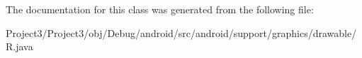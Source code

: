 The documentation for this class was generated from the following file\+:\begin{DoxyCompactItemize}
\item 
Project3/\+Project3/obj/\+Debug/android/src/android/support/graphics/drawable/R.\+java\end{DoxyCompactItemize}
